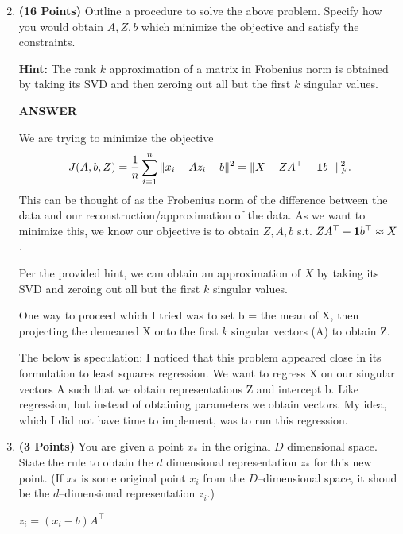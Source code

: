 \documentclass[a4paper]{article}
\newcommand*{\one}{{\bf 1}}
\theoremstyle{definition}
\begin{document}
\begin{enumerate}
\setcounter{enumi}{1}



\item \textbf{(16 Points)}
Outline a procedure to solve the above problem. Specify how you
would obtain $A, Z, b$ which minimize the objective and satisfy the constraints.

\textbf{Hint: }The rank $k$ approximation of a matrix in Frobenius norm is obtained by
taking its SVD and then zeroing out all but the first $k$ singular values.

\textbf{ANSWER}

We are trying to minimize the objective 
\begin{equation}
J(A,b,Z) = \frac{1}{n} \sum_{i=1}^n \|x_i - Az_i - b\|^2 = \| X - ZA^\top - \one b^\top\|_F^2.
\label{eqn:dimobj}
\end{equation}
This can be thought of as the Frobenius norm of the difference between the data and our reconstruction/approximation of the data. As we want to minimize this, we know our objective is to obtain $Z, A, b$ s.t. $ ZA^\top + \one b^\top \approx X$.

Per the provided hint, we can obtain an approximation of $X$ by taking its SVD and zeroing out all but the first $k$ singular values.

One way to proceed which I tried was to set b = the mean of X, then projecting the demeaned X onto the first $k$ singular vectors (A) to obtain Z.

The below is speculation:
I noticed that this problem appeared close in its formulation to least squares regression. We want to regress X on our singular vectors A such that we obtain representations Z and intercept b. Like regression, but instead of obtaining parameters we obtain vectors. My idea, which I did not have time to implement, was to run this regression. 


\item \textbf{(3 Points)}
You are given a point $x_*$ in the original $D$ dimensional space.
State the rule to obtain the $d$ dimensional
representation $z_*$ for this new point.
(If $x_*$ is some original point $x_i$ from the $D$--dimensional space, it shoud be the
$d$--dimensional representation $z_i$.)

$z_i = (x_i - b) A^\top$
 
\end{enumerate}
\end{document}

